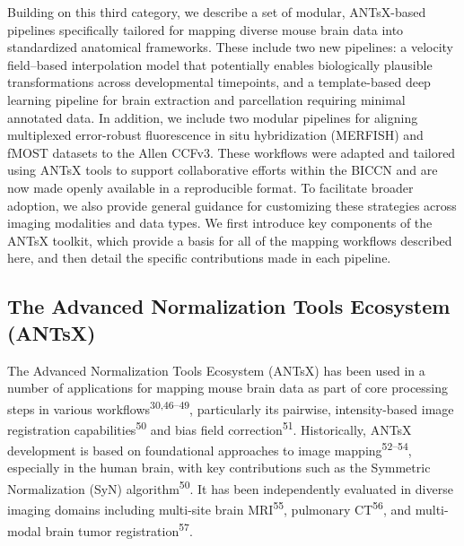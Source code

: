 \documentclass[
  12pt,
]{article}
\begin{document}
Building on this third category, we describe a set of modular,
ANTsX-based pipelines specifically tailored for mapping diverse mouse
brain data into standardized anatomical frameworks. These include two
new pipelines: a velocity field--based interpolation model that
potentially enables biologically plausible transformations across
developmental timepoints, and a template-based deep learning pipeline
for brain extraction and parcellation requiring minimal annotated data.
In addition, we include two modular pipelines for aligning multiplexed
error-robust fluorescence in situ hybridization (MERFISH) and fMOST
datasets to the Allen CCFv3. These workflows were adapted and tailored
using ANTsX tools to support collaborative efforts within the BICCN and
are now made openly available in a reproducible format. To facilitate
broader adoption, we also provide general guidance for customizing these
strategies across imaging modalities and data types. We first introduce
key components of the ANTsX toolkit, which provide a basis for all of
the mapping workflows described here, and then detail the specific
contributions made in each pipeline.

\subsection{The Advanced Normalization Tools Ecosystem
(ANTsX)}\label{the-advanced-normalization-tools-ecosystem-antsx}

The Advanced Normalization Tools Ecosystem (ANTsX) has been used in a
number of applications for mapping mouse brain data as part of core
processing steps in various workflows\textsuperscript{30,46--49},
particularly its pairwise, intensity-based image registration
capabilities\textsuperscript{50} and bias field
correction\textsuperscript{51}. Historically, ANTsX development is based
on foundational approaches to image mapping\textsuperscript{52--54},
especially in the human brain, with key contributions such as the
Symmetric Normalization (SyN) algorithm\textsuperscript{50}. It has been
independently evaluated in diverse imaging domains including multi-site
brain MRI\textsuperscript{55}, pulmonary CT\textsuperscript{56}, and
multi-modal brain tumor registration\textsuperscript{57}.
\end{document}
